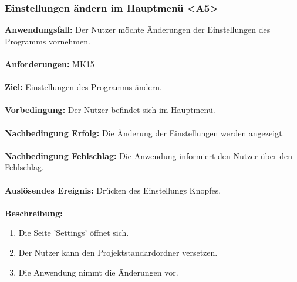 \documentclass[parskip=full]{scrartcl} %
\begin{document}
\subsubsection*{Einstellungen ändern im Hauptmenü <A5>}
\textbf{Anwendungsfall:} Der Nutzer möchte Änderungen der Einstellungen des Programms vornehmen. \\\\
\textbf{Anforderungen:} MK15\\\\
\textbf{Ziel:} Einstellungen des Programms ändern.\\\\
\textbf{Vorbedingung:}  Der Nutzer befindet sich im Hauptmenü.  \\\\
\textbf{Nachbedingung Erfolg:} Die Änderung der Einstellungen werden angezeigt.\\\\
\textbf{Nachbedingung Fehlschlag:} Die Anwendung informiert den Nutzer über den Fehlschlag.\\\\
\textbf{Auslösendes Ereignis:} Drücken des Einstellungs Knopfes. \\\\
\textbf{Beschreibung:}
\begin{enumerate}
    \item Die Seite 'Settings' öffnet sich.
    \item Der Nutzer kann den Projektstandardordner versetzen.
    \item Die Anwendung nimmt die Änderungen vor.
\end{enumerate}
\newpage
\end{document}

